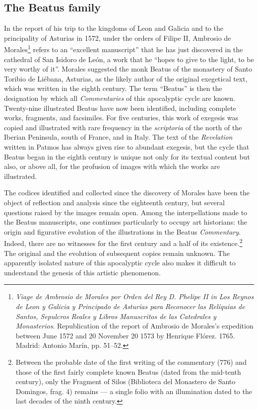 \begin{paper}
\section*{The Beatus family}
In the report of his trip to the kingdoms of Leon and Galicia and to the
principality of Asturias in 1572, under the orders of Filipe II,
Ambrosio de Morales\footnote{\emph{Viage de Ambrosio de Morales por
  Orden del Rey D. Phelipe II in Los Reynos de Leon y Galicia y
  Principado de Asturias para Reconocer las Relíquias de Santos,
  Sepulcros Reales y Libros Manuscritos de las Catedrales y
  Monasterios}. Republication of the report of Ambrosio de Morales's
  expedition between June 1572 and 20 November 20 1573 by Henrique
  Flórez. 1765. Madrid: Antonio Marín, pp. 51--52.} refers to an
``excellent manuscript'' that he has just discovered in the cathedral of
San Isidoro de León, a work that he ``hopes to give to the light, to be
very worthy of it''. Morales suggested the monk Beatus of the monastery
of Santo Toribio de Liébana, Asturias, as the likely author of the
original exegetical text, which was written in the eighth century. The
term ``Beatus'' is then the designation by which all \emph{Commentaries}
of this apocalyptic cycle are known. Twenty-nine illustrated Beatus have
now been identified, including complete works, fragments, and facsimiles.
For five centuries, this work of exegesis was copied and illustrated
with rare frequency in the \emph{scriptoria} of the north of the Iberian
Peninsula, south of France, and in Italy. The text of the
\emph{Revelation} written in Patmos has always given rise to abundant
exegesis, but the cycle that Beatus began in the eighth century is
unique not only for its textual content but also, or above all, for the
profusion of images with which the works are illustrated.

The codices identified and collected since the discovery of Morales have
been the object of reflection and analysis since the eighteenth century,
but several questions raised by the images remain open. Among the
interpellations made to the Beatus manuscripts, one continues
particularly to occupy art historians: the origin and figurative
evolution of the illustrations in the Beatus \emph{Commentary}. Indeed,
there are no witnesses for the first century and a half of its
existence.\footnote{Between the probable date of the first writing of
  the commentary (776) and those of the first fairly complete known
  Beatus (dated from the mid-tenth century), only the Fragment of Silos
  (Biblioteca del Monastero de Santo Domingos, frag. 4) remains ––  a
  single folio with an illumination dated to the last decades of the
  ninth century.} The original and the evolution of subsequent copies
remain unknown. The apparently isolated nature of this apocalyptic cycle
also makes it difficult to understand the genesis of this artistic
phenomenon.


\end{paper}
